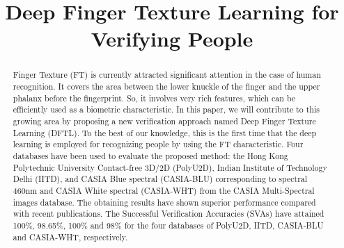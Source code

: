 \documentclass[conference]{IEEEtran}
\begin{document}
\title{Deep Finger Texture Learning for Verifying People\\
}

\author{
\and
{}
\and
{}
}

\maketitle

\begin{abstract}
Finger Texture (FT) is currently attracted significant attention in the case of human recognition. It covers the area between the lower knuckle of the finger and the upper phalanx before the fingerprint. So, it involves very rich features, which can be efficiently used as a biometric characteristic. In this paper, we will contribute to this growing area by proposing a new verification approach named Deep Finger Texture Learning (DFTL). To the best of our knowledge, this is the first time that the deep learning is employed for recognizing people by using the FT characteristic. Four databases have been used to evaluate the proposed method: the Hong Kong Polytechnic University Contact-free 3D/2D (PolyU2D), Indian Institute of Technology Delhi (IITD), and CASIA Blue spectral (CASIA-BLU) corresponding to spectral 460nm and CASIA White spectral (CASIA-WHT) from the CASIA Multi-Spectral images database. The obtaining results have shown superior performance compared with recent publications. The Successful Verification Accuracies (SVAs) have attained 100\%, 98.65\%, 100\% and 98\% for the four databases of PolyU2D, IITD, CASIA-BLU and CASIA-WHT, respectively. 
\end{abstract}
\end{document}
